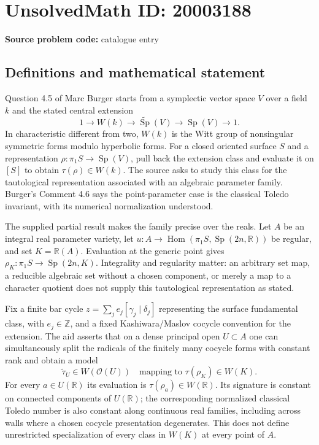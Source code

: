\documentclass[11pt]{article}
\newcommand{\Z}{\mathbb{Z}}
\newcommand{\R}{\mathbb{R}}
\begin{document}
\section*{UnsolvedMath ID: 20003188}
\textbf{Source problem code:} catalogue entry
\subsection{Definitions and mathematical statement}
Question 4.5 of Marc Burger starts from a symplectic vector space $V$ over a field $k$ and the stated central extension
\[
 1\longrightarrow W(k)\longrightarrow\widetilde{\operatorname{Sp}}(V)
       \longrightarrow\operatorname{Sp}(V)\longrightarrow1.
\]
In characteristic different from two, $W(k)$ is the Witt group of nonsingular symmetric forms modulo hyperbolic forms. For a closed oriented surface $S$ and a representation $\rho:\pi_1S\to\operatorname{Sp}(V)$, pull back the extension class and evaluate it on $[S]$ to obtain $\tau(\rho)\in W(k)$. The source asks to study this class for the tautological representation associated with an algebraic parameter family. Burger's Comment 4.6 says the point-parameter case is the classical Toledo invariant, with its numerical normalization understood.

The supplied partial result makes the family precise over the reals. Let $A$ be an integral real parameter variety, let $u:A\to\operatorname{Hom}(\pi_1S,\operatorname{Sp}(2n,\R))$ be regular, and set $K=\R(A)$. Evaluation at the generic point gives $\rho_K:\pi_1S\to\operatorname{Sp}(2n,K)$. Integrality and regularity matter: an arbitrary set map, a reducible algebraic set without a chosen component, or merely a map to a character quotient does not supply this tautological representation as stated.

Fix a finite bar cycle $z=\sum_j e_j[\gamma_j\mid\delta_j]$ representing the surface fundamental class, with $e_j\in\Z$, and a fixed Kashiwara/Maslov cocycle convention for the extension. The aid asserts that on a dense principal open $U\subset A$ one can simultaneously split the radicals of the finitely many cocycle forms with constant rank and obtain a model
\[
 \widetilde\tau_U\in W(\mathcal O(U))
 \quad\text{mapping to }\tau(\rho_K)\in W(K).
\]
For every $a\in U(\R)$ its evaluation is $\tau(\rho_a)\in W(\R)$. Its signature is constant on connected components of $U(\R)$; the corresponding normalized classical Toledo number is also constant along continuous real families, including across walls where a chosen cocycle presentation degenerates. This does not define unrestricted specialization of every class in $W(K)$ at every point of $A$.
\end{document}
